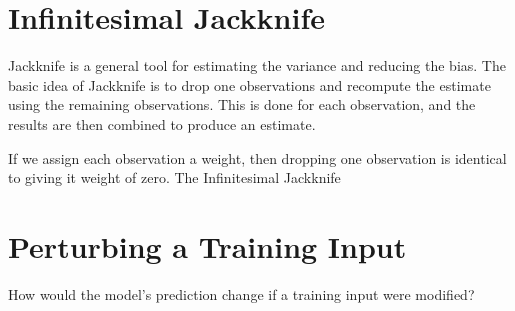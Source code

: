 \documentclass{article}
\theoremstyle{definition}
\begin{document}
\section{Infinitesimal Jackknife}
Jackknife is a general tool for estimating the variance and reducing the bias.
The basic idea of Jackknife is to drop one observations and recompute the estimate using the remaining observations.
This is done for each observation, and the results are then combined to produce an estimate.


If we assign each observation a weight, then dropping one observation is identical to giving it weight of zero.
The Infinitesimal Jackknife




\section{Perturbing a Training Input}
How would the model's prediction change if a training input were modified?
\end{document}
